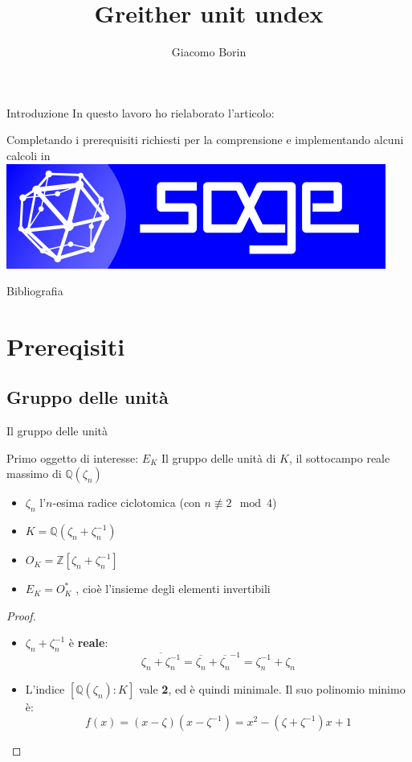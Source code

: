\documentclass{beamer}
\title{Greither unit undex}
\author{Giacomo Borin}
\institute{Dipartimento di Matematica}
\newcommand{\mybibexclude}[1]{\addtocategory{fullcited}{#1}}
\theoremstyle{plain}
\theoremstyle{remark}
\theoremstyle{definition}
\newcommand{\sage}{\href{https://www.sagemath.org}{\includegraphics[height=\fontcharht\font`\B]{../images/sage.png} }}
\newcommand{\noqed}{\let\qed\relax}
\newcommand{\Z}{\mathbb{Z}}
\newcommand{\Q}{\mathbb{Q}}
\begin{document}
	\begin{frame}[plain]
	    \maketitle
	\end{frame}
	
	\begin{frame}{Introduzione}
		In questo lavoro ho rielaborato l'articolo:
		\begin{exampleblock}{}
			 \mybibexclude{GRE}
		\end{exampleblock}	
		\pause
		Completando i prerequisiti richiesti per la comprensione e implementando alcuni calcoli in \sage
	\end{frame}
	
	\begin{frame}[allowframebreaks]{Bibliografia}
			\printbibliography[heading=none, notcategory=fullcited]
	\end{frame}
	

	
\section{Prereqisiti}
\subsection{Gruppo delle unità}
	\begin{frame}{Il gruppo delle unità}
		\begin{block}{Primo oggetto di interesse: $ E_K $}
			Il gruppo delle unità di $ K $, il sottocampo reale massimo di $ \Q (\zeta_n )  $
		\end{block}
		\pause
		\begin{itemize}
			\item $ \zeta_n $  l'$ n $-esima radice ciclotomica (con $ n \not \equiv 2 \mod 4 $) \pause
			\item $ K = \Q (\zeta_n + \zeta_n^{-1})$ \pause
			\item $ O_K = \Z[\zeta_n + \zeta_n^{-1}] $ \pause
			\item $ E_K = O _K ^\ast$ , cioè l'insieme degli elementi invertibili 
		\end{itemize}
		\hyperlink{skip1}{ }
	\end{frame}
	
	\begin{frame}
		\begin{proof} \noqed
			\begin{itemize}
			\item $  \zeta_n + \zeta_n^{-1}  $ è \textbf{reale}:
			\[ \overline{\zeta_n + \zeta_n^{-1}} = \overline{\zeta_n} + \overline{\zeta_n}^{-1} = \zeta_n^{-1} + \zeta_n \] \pause
			\item L'indice $ [\Q(\zeta_n) : K] $ vale \textbf{2}, ed è quindi minimale. \pause 
			Il suo polinomio minimo è: 
			\[ f(x) = (x-\zeta)(x- \zeta^{-1}) = x^2 - (\zeta + \zeta ^{-1})x +1   \]
			\end{itemize}
		\end{proof}
	\end{frame}
	
\end{document}
